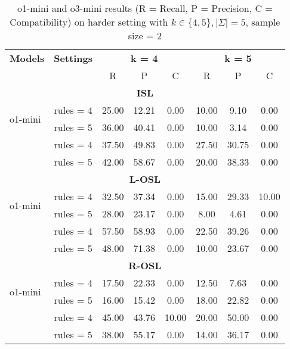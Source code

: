 \begin{table}[!ht]
    \centering
    \begin{tabular}{l c ccc ccc}
        \toprule
          \multirow{2.5}{*}{\bf Models}& \multirow{2.5}{*}{\bf Settings}& \multicolumn{3}{c}{\bf k = 4} & \multicolumn{3}{c}{\bf k = 5}\\
          \cmidrule(lr){3-5} \cmidrule(lr){6-8} 
          & & R  & P & C & R  & P & C\\
            \midrule \multicolumn{8}{c}{\textbf{ISL}} \\
            \midrule
           \multirow{2}{*}{o1-mini} & rules = 4 & 25.00 & 12.21 & 0.00 & 10.00 & 9.10 & 0.00\\
           & rules = 5 & 36.00 & 40.41 & 0.00 & 10.00 & 3.14 & 0.00\\
           \hdashline
           \multirow{2}{*}{o3-mini} & rules = 4 & 37.50 & 49.83 & 0.00 & 27.50 & 30.75 & 0.00\\
           & rules = 5 & 42.00 & 58.67 & 0.00 & 20.00 & 38.33 & 0.00\\
           \midrule \multicolumn{8}{c}{\textbf{L-OSL}} \\
            \midrule
           \multirow{2}{*}{o1-mini} & rules = 4 & 32.50 & 37.34 & 0.00 & 15.00 & 29.33 & 10.00\\
           & rules = 5 & 28.00 & 23.17 & 0.00 & 8.00 & 4.61 & 0.00\\
           \hdashline
           \multirow{2}{*}{o3-mini} & rules = 4 & 57.50 & 58.93 & 0.00 & 22.50 & 39.26 & 0.00\\
           & rules = 5 & 48.00 & 71.38 & 0.00 & 10.00 & 23.67 & 0.00\\
           \midrule \multicolumn{8}{c}{\textbf{R-OSL}} \\
            \midrule
           \multirow{2}{*}{o1-mini} & rules = 4 & 17.50 & 22.33 & 0.00 & 12.50 & 7.63 & 0.00\\
           & rules = 5 & 16.00 & 15.42 & 0.00 & 18.00 & 22.82 & 0.00\\
           \hdashline
           \multirow{2}{*}{o3-mini} & rules = 4 & 45.00 & 43.76 & 10.00 & 20.00 & 50.00 & 0.00\\
           & rules = 5 & 38.00 & 55.17 & 0.00 & 14.00 & 36.17 & 0.00\\
           \bottomrule
    \end{tabular}
    \caption{o1-mini and o3-mini results (R = Recall, P = Precision, C = Compatibility) on harder setting with $k\in\{4, 5\}, |\Sigma| = 5$, sample size = 2}
    \vspace{-10pt}
    \label{tab:harder}
\end{table}



